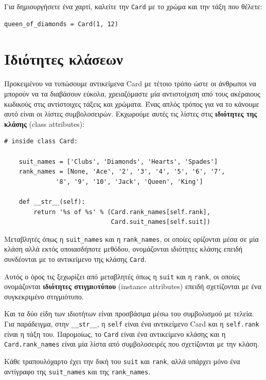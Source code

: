 \documentclass[10pt]{book}
\begin{document}
Για δημιουργήσετε ένα χαρτί, καλείτε την {\tt Card} με το χρώμα και την τάξη
που θέλετε:

\begin{verbatim}
queen_of_diamonds = Card(1, 12)
\end{verbatim}
%


 
\section{Ιδιότητες κλάσεων}
\label{class.attribute}

Προκειμένου να τυπώσουμε αντικείμενα Card με τέτοιο τρόπο ώστε οι άνθρωποι
να μπορούν να τα διαβάσουν εύκολα, χρειαζόμαστε μία αντιστοίχιση από τους ακέραιους
κωδικούς στις αντίστοιχες τάξεις και χρώματα. Ένας απλός τρόπος για να το κάνουμε αυτό είναι 
οι λίστες συμβολοσειρών. Εκχωρούμε αυτές τις λίστες στις {\bf ιδιότητες της κλάσης} (class attributes):

\begin{verbatim}
# inside class Card:

    suit_names = ['Clubs', 'Diamonds', 'Hearts', 'Spades']
    rank_names = [None, 'Ace', '2', '3', '4', '5', '6', '7',
              '8', '9', '10', 'Jack', 'Queen', 'King']

    def __str__(self):
        return '%s of %s' % (Card.rank_names[self.rank],
                             Card.suit_names[self.suit])
\end{verbatim}
%
Μεταβλητές όπως η \verb"suit_names" και η \verb"rank_names", οι οποίες ορίζονται μέσα σε μία κλάση
αλλά εκτός οποιασδήποτε μεθόδου, ονομάζονται ιδιότητες κλάσης επειδή συνδέονται με το αντικείμενο της κλάσης
{\tt Card}.

Αυτός ο όρος τις ξεχωρίζει από μεταβλητές όπως η {\tt suit} και η {\tt rank}, οι οποίες ονομάζονται 
{\bf ιδιότητες στιγμιoτύπου} (instance attributes) επειδή σχετίζονται με ένα συγκεκριμένο στιγμιότυπο.

Και τα δύο είδη των ιδιοτήτων είναι προσβάσιμα μέσω του συμβολισμού με τελεία. Για παράδειγμα, στην
\verb"__str__", η {\tt self} είναι ένα αντικείμενο Card και η {\tt self.rank} είναι η τάξη του. Παρομοίως,
το {\tt Card} είναι ένα αντικείμενο κλάσης και η \verb"Card.rank_names" είναι μία λίστα από συμβολοσειρές
που σχετίζονται με την κλάση.

Κάθε τραπουλόχαρτο έχει την δική του {\tt suit} και {\tt rank}, αλλά
υπάρχει μόνο ένα αντίγραφο της \verb"suit_names" και της \verb"rank_names".
\end{document}
